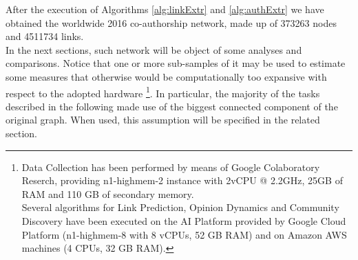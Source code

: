 \documentclass[sigchi]{acmart}
\begin{document}
After the execution of Algorithms \ref{alg:linkExtr} and \ref{alg:authExtr} we have obtained the worldwide 2016 co-authorship network, made up of 373263 nodes and 4511734 links. \\
In the next sections, such network will be object of some analyses and comparisons. Notice that one or more sub-samples of it may be used to estimate some measures that otherwise would be computationally too expansive with respect to the adopted hardware
\footnote{
\noindent Data Collection has been performed by means of Google Colaboratory Reserch, providing n1-highmem-2 instance with 2vCPU @ 2.2GHz, 25GB of RAM and 110 GB of secondary memory. \\
Several algorithms for Link Prediction, Opinion Dynamics and Community Discovery have been executed on the AI Platform provided by Google Cloud Platform (n1-highmem-8 with 8 vCPUs, 52 GB RAM) and on Amazon AWS machines (4 CPUs, 32 GB RAM).
}. In particular, the majority of the tasks described in the following made use of the biggest connected component of the original graph. When used, this assumption will be specified in the related section.
\end{document}
